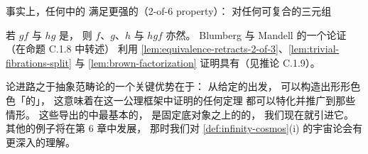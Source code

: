 \begin{remark}\label{rem:equivalence-2-of-6}
事实上，任何\trInfinityCosmos{}中的\trEquivalence{}%
满足更强的\textbf{\trTwoOfSixProperty}（2-of-6 property）：
对任何可复合的\trFunctor{}三元组
\begin{center}
\end{center}
若 $gf$ 与 $hg$ 是\trEquivalence{}，
则 $f$、$g$、$h$ 与 $hgf$ 亦然。
Blumberg 与 Mandell 的一个论证 \cite[6.4]{bib20}
（在命题 C.1.8 中转述） %
利用 \cref{lem:equivalence-retracts-2-of-3}、\cref{lem:trivial-fibrations-split}
与 \cref{lem:brown-factorization}
证明\trEquivalence{}具有\trTwoOfSixProperty{}（见推论 C.1.9）。 %
\end{remark}

\trInfinityCosmos{}论进路之于抽象范畴论的一个关键优势在于：
从给定的\trInfinityCosmos{}出发，
可以构造出形形色色「\trFibration{}的」\trInfinityCosmos{}，
这意味着在这一公理框架中证明的任何定理
都可以特化并推广到那些情形。
这些导出的\trInfinityCosmos{}中最基本的，
是固定底对象之上的\trIsofibration{}的\trInfinityCosmos{}，
我们现在就引进它。
其他\trInfinityCosmos{}的例子将在第 6 章中发展，
那时我们对 \cref{def:infinity-cosmos}(i) 的宇宙论\trLimit{}会有更深入的理解。

